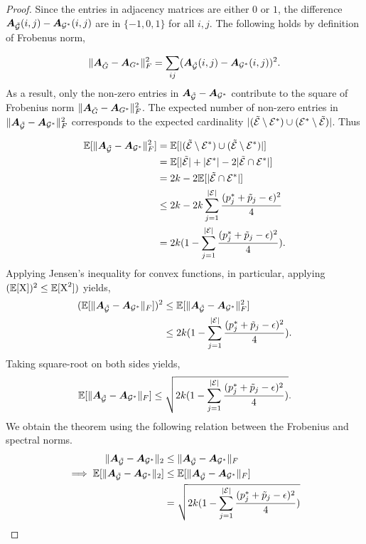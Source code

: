 \begin{proof}
Since the entries in adjacency matrices are either $0$ or $1$, the difference ${\bm{A}}_{\tilde{{\mathcal{G}}}}(i,j) - {\bm{A}}_{{\mathcal{G}}^*}(i,j)$ are in $\{-1,0,1\}$ for all $i,j$. The following holds by definition of Frobenus norm,

\[
\|{\bm{A}}_{\tilde{G}} - {\bm{A}}_{G^*}\|^2_F = \sum_{ij}({\bm{A}}_{\tilde{{\mathcal{G}}}}(i,j) - {\bm{A}}_{{\mathcal{G}}^*}(i,j))^2.
\] 
As a result, only the non-zero entries in ${\bm{A}}_{\tilde{{\mathcal{G}}}} - {\bm{A}}_{{\mathcal{G}}^*}$ contribute to the square of Frobenius norm $\|{\bm{A}}_{\tilde{G}} - {\bm{A}}_{G^*}\|^2_F$.
The expected number of non-zero entries in $\|{\bm{A}}_{\tilde{{\mathcal{G}}}} - {\bm{A}}_{{\mathcal{G}}^*}\|^2_F$ corresponds to the expected cardinality $\lvert(\mathcal{\tilde{E}} \setminus \mathcal{E}^*) \cup (\mathcal{E}^* \setminus \mathcal{\tilde{E}})\rvert$. Thus

\begin{align*}
    \mathbb{E}[\|{\bm{A}}_{\tilde{{\mathcal{G}}}} - {\bm{A}}_{{\mathcal{G}}^*}\|^2_F] &= \mathbb{E}[\lvert(\mathcal{\tilde{E}} \setminus \mathcal{E}^*) \cup (\mathcal{\tilde{E}} \setminus \mathcal{E}^*)\rvert] \\ 
    &= \mathbb{E}[\lvert\mathcal{\tilde{E}}\rvert + \lvert\mathcal{E}^*\rvert - 2 \lvert\mathcal{\tilde{E}} \cap \mathcal{E}^*\rvert] \\
    &= 2k - 2\mathbb{E}[\lvert\mathcal{\tilde{E}} \cap \mathcal{E}^*\rvert] \\
    &\leq 2k - 2k \sum_{j=1}^{|\mathcal{E}|} \frac{(p^*_j + \tilde{p}_j - \epsilon)^2}{4} \\
    &= 2k (1 - \sum_{j=1}^{|\mathcal{E}|} \frac{(p^*_j + \tilde{p}_j - \epsilon)^2}{4}).
\end{align*}
Applying Jensen's inequality for convex functions, in particular, applying $(\mathbb{E}[{\textnormal{X}}])^2 \leq \mathbb{E}[{\textnormal{X}}^2])$ yields,
\begin{align*}
     (\mathbb{E}[\|{\bm{A}}_{\tilde{{\mathcal{G}}}} - {\bm{A}}_{{\mathcal{G}}^*}\|_F])^2 &\leq  \mathbb{E}[\|{\bm{A}}_{\tilde{{\mathcal{G}}}} - {\bm{A}}_{{\mathcal{G}}^*}\|^2_F] \\
     &\leq 2k (1 - \sum_{j=1}^{|\mathcal{E}|} \frac{(p^*_j + \tilde{p}_j - \epsilon)^2}{4}).
\end{align*}
Taking square-root on both sides yields,
\[
 \mathbb{E}[\|{\bm{A}}_{\tilde{{\mathcal{G}}}} - {\bm{A}}_{{\mathcal{G}}^*}\|_F] \leq \sqrt{2k (1 - \sum_{j=1}^{|\mathcal{E}|} \frac{(p^*_j + \tilde{p}_j - \epsilon)^2}{4})}.
\]
We obtain the theorem using the following relation between the Frobenius and spectral norms.
\begin{align*}
    \|{\bm{A}}_{\tilde{{\mathcal{G}}}} - {\bm{A}}_{{\mathcal{G}}^*}\|_2 &\leq \|{\bm{A}}_{\tilde{{\mathcal{G}}}} - {\bm{A}}_{{\mathcal{G}}^*}\|_F \\
    \implies \mathbb{E}[\|{\bm{A}}_{\tilde{{\mathcal{G}}}} - {\bm{A}}_{{\mathcal{G}}^*}\|_2] &\leq \mathbb{E}[\|{\bm{A}}_{\tilde{{\mathcal{G}}}} - {\bm{A}}_{{\mathcal{G}}^*}\|_F] \\
    &= \sqrt{2k (1 - \sum_{j=1}^{|\mathcal{E}|} \frac{(p^*_j + \tilde{p}_j - \epsilon)^2}{4})}
\end{align*}
\end{proof}
